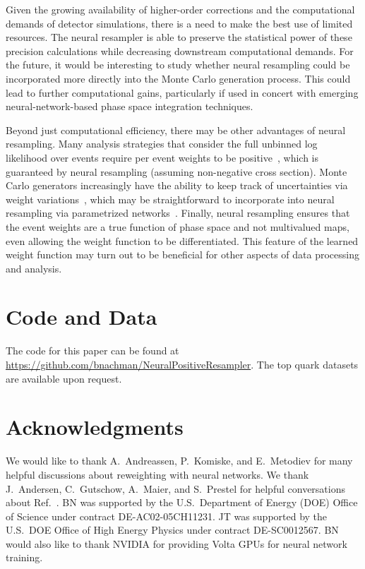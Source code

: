 \documentclass[prd,twocolumn,superscriptaddress,longbibliography,preprintnumbers,floatfix,nofootinbib]{revtex4-1}
\DeclareRobustCommand{\Ref}[1]{Ref.~\cite{#1}}
\begin{document}
Given the growing availability of higher-order corrections and the computational demands of detector simulations, there is a need to make the best use of limited resources.
%
The neural resampler is able to preserve the statistical power of these precision calculations while decreasing downstream computational demands.
%
For the future, it would be interesting to study whether neural resampling could be incorporated more directly into the Monte Carlo generation process.
%
This could lead to further computational gains, particularly if used in concert with emerging neural-network-based phase space integration techniques.


Beyond just computational efficiency, there may be other advantages of neural resampling.
%
Many analysis strategies that consider the full unbinned log likelihood over events require per event weights to be positive~\cite{Nachman:2019dol}, which is guaranteed by neural resampling (assuming non-negative cross section).
%
Monte Carlo generators increasingly have the ability to keep track of uncertainties via weight variations~\cite{Mrenna:2016sih,Bothmann:2016nao}, which may be straightforward to incorporate into neural resampling via parametrized networks~\cite{Baldi:2016fzo,Andreassen:2019nnm}.
%
Finally, neural resampling ensures that the event weights are a true function of phase space and not multivalued maps, even allowing the weight function to be differentiated.
%
This feature of the learned weight function may turn out to be beneficial for other aspects of data processing and analysis.


\section*{Code and Data}

The code for this paper can be found at \url{https://github.com/bnachman/NeuralPositiveResampler}.  The top quark datasets are available upon request.

\section*{Acknowledgments}

We would like to thank A.~Andreassen, P.~Komiske, and E.~Metodiev for many helpful discussions about reweighting with neural networks.
%
We thank J.~Andersen, C.~Gutschow, A.~Maier, and S.~Prestel for helpful conversations about \Ref{andersen2020positive}.
%
BN was supported by the U.S.~Department of Energy (DOE) Office of Science under contract DE-AC02-05CH11231.
%
JT was supported by the U.S.~DOE Office of High Energy Physics under contract DE-SC0012567.
%
BN would also like to thank NVIDIA for providing Volta GPUs for neural network training.


\end{document}
